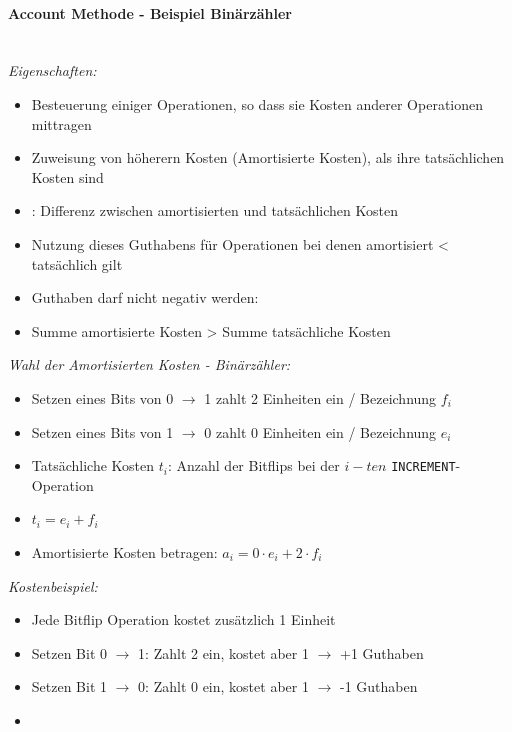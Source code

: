 \documentclass[
    ngerman,
    color=3b,
    load_common, %
    summary,
    boxarc,
]{rubos-tuda-template}
\begin{document}
\pagebreak

\paragraph{Account Methode - Beispiel Binärzähler}\mbox{}\vspace{1em}\\
\textit{Eigenschaften:}
          \begin{itemize}
              \item Besteuerung einiger Operationen, so dass sie Kosten anderer Operationen mittragen
              \item Zuweisung von höherern Kosten (Amortisierte Kosten), als ihre tatsächlichen Kosten sind
              \item {}: Differenz zwischen amortisierten und tatsächlichen Kosten
              \item Nutzung dieses Guthabens für Operationen bei denen amortisiert < tatsächlich gilt
              \item Guthaben darf nicht negativ werden:
              \item[] Summe amortisierte Kosten > Summe tatsächliche Kosten
          \end{itemize}

\textit{Wahl der Amortisierten Kosten - Binärzähler:}
          \begin{itemize}
              \item Setzen eines Bits von 0 $\rightarrow$ 1 zahlt 2 Einheiten ein / Bezeichnung $f_i$
              \item Setzen eines Bits von 1 $\rightarrow$ 0 zahlt 0 Einheiten ein / Bezeichnung $e_i$
              \item Tatsächliche Kosten $t_i$: Anzahl der Bitflips bei der $i-ten$ \texttt{INCREMENT}-Operation
              \item[] $t_i = e_i + f_i$
              \item Amortisierte Kosten betragen: $a_i = 0 \cdot e_i + 2 \cdot f_i$
          \end{itemize}

\textit{Kostenbeispiel:}
          \begin{itemize}
              \item Jede Bitflip Operation kostet zusätzlich 1 Einheit
              \item Setzen Bit 0 $\rightarrow$ 1: Zahlt 2 ein, kostet aber 1 $\rightarrow$ +1 Guthaben
              \item Setzen Bit 1 $\rightarrow$ 0: Zahlt 0 ein, kostet aber 1 $\rightarrow$ -1 Guthaben
              \item[]
          \end{itemize}
\end{document}
